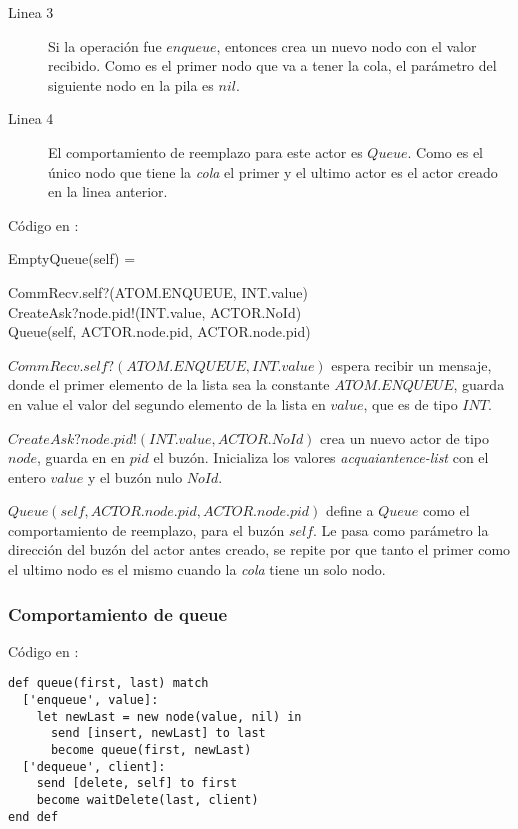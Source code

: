 \begin{description}
 \item [Linea 3] Si la operación fue $enqueue$, entonces crea un nuevo nodo con el valor recibido. Como es el primer nodo que va a tener la cola, el parámetro del siguiente nodo en la pila es $nil$.
 \item [Linea 4] El comportamiento de reemplazo para este actor es $Queue$. Como es el único nodo que tiene la \textit{cola} el primer y el ultimo actor es el actor creado en la linea anterior.
\end{description}

Código en \CSPm:

\begin{process}
EmptyQueue(self) = \\ \quad
  \begin{block}
  CommRecv.self?(ATOM.ENQUEUE, INT.value) \then \\ 
  CreateAsk?node.pid!(INT.value, ACTOR.NoId) \then \\
  Queue(self, ACTOR.node.pid, ACTOR.node.pid)
  \end{block}
\end{process}

\begin{description}
 \item $CommRecv.self?(ATOM.ENQUEUE, INT.value)$ espera recibir un mensaje, donde el primer elemento de la lista sea la constante $ATOM.ENQUEUE$, guarda en value el valor del segundo elemento de la lista en $value$, que es de tipo $INT$.
 \item $CreateAsk?node.pid!(INT.value, ACTOR.NoId)$ crea un nuevo actor de tipo $node$, guarda en en $pid$ el buzón. Inicializa los valores \textit{acquaiantence-list} con el entero $value$ y el buzón nulo $NoId$.
 \item $Queue(self, ACTOR.node.pid, ACTOR.node.pid)$ define a $Queue$ como el comportamiento de reemplazo, para el buzón $self$. Le pasa como parámetro la dirección del buzón del actor antes creado, se repite por que tanto el primer como el ultimo nodo es el mismo cuando la \textit{cola} tiene un solo nodo.
\end{description}

\subsubsection*{Comportamiento de queue}

Código en \SAL:

\begin{lstlisting}[language=sal, style=simple]
def queue(first, last) match 
  ['enqueue', value]: 
    let newLast = new node(value, nil) in
      send [insert, newLast] to last
      become queue(first, newLast)
  ['dequeue', client]: 
    send [delete, self] to first
    become waitDelete(last, client)
end def
\end{lstlisting}

